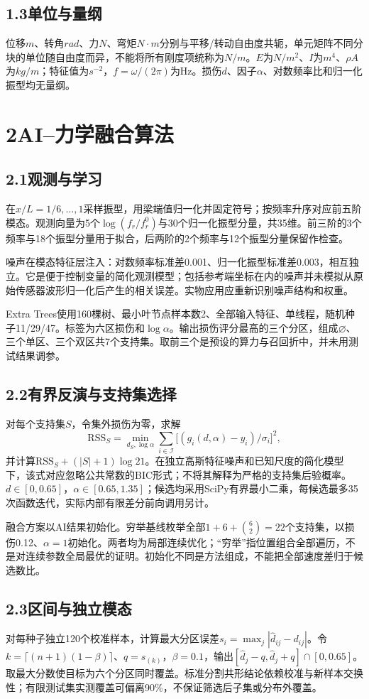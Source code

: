 \documentclass[UTF8,a4paper,11pt,fontset=fandol]{ctexart}
\begin{document}
\subsection*{1.3\quad 单位与量纲}
位移$m$、转角$rad$、力$N$、弯矩$N\cdot m$分别与平移/转动自由度共轭，单元矩阵不同分块的单位随自由度而异，不能将所有刚度项统称为$N/m$。$E$为$N/m^2$、$I$为$m^4$、$\rho A$为$kg/m$；特征值为$s^{-2}$，$f=\omega/(2\pi)$为Hz。损伤$d$、因子$\alpha$、对数频率比和归一化振型均无量纲。
\newpage
\section*{2\quad AI--力学融合算法}
\subsection*{2.1\quad 观测与学习}
在$x/L=1/6,\ldots,1$采样振型，用梁端值归一化并固定符号；按频率升序对应前五阶模态。观测向量为5个$\log(f_r/f_r^0)$与30个归一化振型分量，共35维。前三阶的3个频率与18个振型分量用于拟合，后两阶的2个频率与12个振型分量保留作检查。

噪声在模态特征层注入：对数频率标准差0.001、归一化振型标准差0.003，相互独立。它是便于控制变量的简化观测模型；包括参考端坐标在内的噪声并未模拟从原始传感器波形归一化后产生的相关误差。实物应用应重新识别噪声结构和权重。

Extra Trees使用160棵树、最小叶节点样本数2、全部输入特征、单线程，随机种子11/29/47。标签为六区损伤和$\log\alpha$。输出损伤评分最高的三个分区，组成$\varnothing$、三个单区、三个双区共7个支持集。取前三个是预设的算力与召回折中，并未用测试结果调参。
\subsection*{2.2\quad 有界反演与支持集选择}
对每个支持集$S$，令集外损伤为零，求解
\[
\mathrm{RSS}_S=\min_{d_S,\log\alpha}\sum_{i\in\mathcal I}\big[(g_i(d,\alpha)-y_i)/\sigma_i\big]^2,
\]
并计算$\mathrm{RSS}_S+(|S|+1)\log21$。在独立高斯特征噪声和已知尺度的简化模型下，该式对应忽略公共常数的BIC形式；不将其解释为严格的支持集后验概率。$d\in[0,0.65]$，$\alpha\in[0.65,1.35]$；候选均采用SciPy有界最小二乘，每候选最多35次函数迭代，实际内部有限差分前向调用另计。

融合方案以AI结果初始化。穷举基线枚举全部$1+6+\binom62=22$个支持集，以损伤0.12、$\alpha=1$初始化。两者均为局部连续优化；“穷举”指位置组合全部遍历，不是对连续参数全局最优的证明。初始化不同是方法组成，不能把全部速度差归于候选数比。
\subsection*{2.3\quad 区间与独立模态}
对每种子独立120个校准样本，计算最大分区误差$s_i=\max_j|\hat d_{ij}-d_{ij}|$。令$k=\lceil(n+1)(1-\beta)\rceil$、$q=s_{(k)}$，$\beta=0.1$，输出$[\hat d_j-q,\hat d_j+q]\cap[0,0.65]$。取最大分数使目标为六个分区同时覆盖。标准分割共形结论依赖校准与新样本交换性；有限测试集实测覆盖可偏离90\%，不保证筛选后子集或分布外覆盖。
\end{document}
